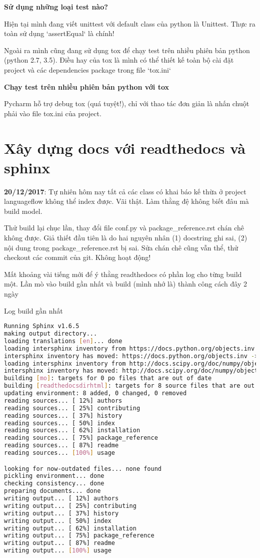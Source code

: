 \textbf{Sử dụng những loại test nào?}

Hiện tại mình đang viết unittest với default class của python là Unittest. Thực ra toàn sử dụng `assertEqual` là chính!

Ngoài ra mình cũng đang sử dụng tox để chạy test trên nhiều phiên bản python (python 2.7, 3.5). Điều hay của tox là mình có thể thiết kế toàn bộ cài đặt project và các dependencies package trong file `tox.ini`

\textbf{Chạy test trên nhiều phiên bản python với tox}

Pycharm hỗ trợ debug tox (quá tuyệt!), chỉ với thao tác đơn giản là nhấn chuột phải vào file tox.ini của project.

\section{Xây dựng docs với readthedocs và sphinx}

\noindent \textbf{20/12/2017}: Tự nhiên hôm nay tất cả các class có khai báo kế thừa ở project languageflow không thể index được. Vãi thật. Làm thằng đệ không biết đâu mà build model.

Thử build lại chục lần, thay đổi file conf.py và package\_reference.rst chán chê không được. Giả thiết đầu tiên là do hai nguyên nhân (1) docstring ghi sai, (2) nội dung trong package\_reference.rst bị sai. Sửa chán chê cũng vẫn thể, thử checkout các commit của git. Không hoạt động!

Mất khoảng vài tiếng mới để ý thằng readthedocs có phần log cho từng build một. Lần mò vào build gần nhất và build (mình nhớ là) thành công cách đây 2 ngày

\noindent Log build gần nhất

\begin{lstlisting}[language=bash]
Running Sphinx v1.6.5
making output directory...
loading translations [en]... done
loading intersphinx inventory from https://docs.python.org/objects.inv...
intersphinx inventory has moved: https://docs.python.org/objects.inv -> https://docs.python.org/2/objects.inv
loading intersphinx inventory from http://docs.scipy.org/doc/numpy/objects.inv...
intersphinx inventory has moved: http://docs.scipy.org/doc/numpy/objects.inv -> https://docs.scipy.org/doc/numpy/objects.inv
building [mo]: targets for 0 po files that are out of date
building [readthedocsdirhtml]: targets for 8 source files that are out of date
updating environment: 8 added, 0 changed, 0 removed
reading sources... [ 12%] authors
reading sources... [ 25%] contributing
reading sources... [ 37%] history
reading sources... [ 50%] index
reading sources... [ 62%] installation
reading sources... [ 75%] package_reference
reading sources... [ 87%] readme
reading sources... [100%] usage

looking for now-outdated files... none found
pickling environment... done
checking consistency... done
preparing documents... done
writing output... [ 12%] authors
writing output... [ 25%] contributing
writing output... [ 37%] history
writing output... [ 50%] index
writing output... [ 62%] installation
writing output... [ 75%] package_reference
writing output... [ 87%] readme
writing output... [100%] usage
\end{lstlisting}


